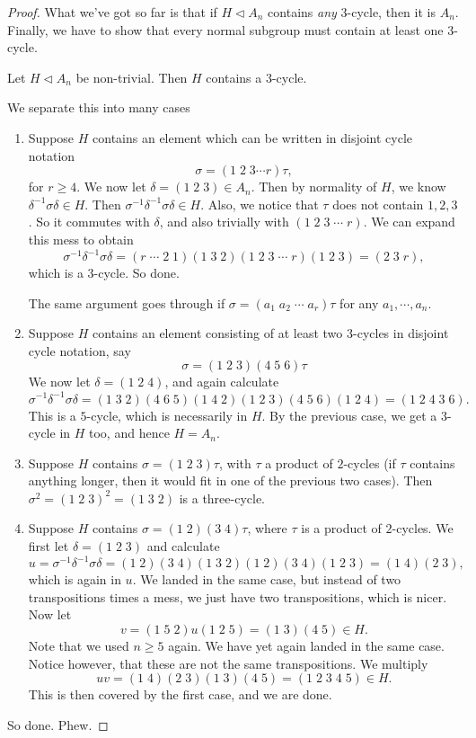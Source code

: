 \documentclass[a4paper]{article}
\begin{document}
\begin{proof}
  What we've got so far is that if $H \lhd A_n$ contains \emph{any} $3$-cycle, then it is $A_n$. Finally, we have to show that every normal subgroup must contain at least one $3$-cycle.
  \begin{claim}
    Let $H \lhd A_n$ be non-trivial. Then $H$ contains a $3$-cycle.
  \end{claim}
  We separate this into many cases
  \begin{enumerate}
    \item Suppose $H$ contains an element which can be written in disjoint cycle notation
      \[
        \sigma = (1\; 2\; 3 \cdots r) \tau,
      \]
      for $r \geq 4$. We now let $\delta = (1\; 2\; 3) \in A_n$. Then by normality of $H$, we know $\delta^{-1} \sigma \delta \in H$. Then $\sigma^{-1}\delta^{-1}\sigma \delta \in H$. Also, we notice that $\tau$ does not contain $1, 2, 3$. So it commutes with $\delta$, and also trivially with $(1\; 2\; 3\; \cdots\; r)$. We can expand this mess to obtain
      \[
        \sigma^{-1} \delta^{-1} \sigma\delta = (r\; \cdots \; 2\; 1)(1\; 3\; 2)(1\; 2\; 3\; \cdots \; r)(1\; 2\; 3) = (2\; 3 \; r),
      \]
      which is a $3$-cycle. So done.

      The same argument goes through if $\sigma = (a_1 \; a_2 \; \cdots \; a_r) \tau$ for any $a_1, \cdots, a_n$.
    \item Suppose $H$ contains an element consisting of at least two $3$-cycles in disjoint cycle notation, say
      \[
        \sigma = (1\; 2\; 3)(4\; 5\; 6)\tau
      \]
      We now let $\delta = (1\; 2\; 4)$, and again calculate
      \[
        \sigma^{-1} \delta^{-1}\sigma\delta = (1\; 3\; 2)(4\; 6\; 5)(1\; 4\; 2)(1\; 2\; 3)(4\; 5\; 6)(1\; 2\; 4) = (1\; 2\; 4\; 3\; 6).
      \]
      This is a $5$-cycle, which is necessarily in $H$. By the previous case, we get a $3$-cycle in $H$ too, and hence $H = A_n$.
    \item Suppose $H$ contains $\sigma = (1\; 2\; 3)\tau$, with $\tau$ a product of $2$-cycles (if $\tau$ contains anything longer, then it would fit in one of the previous two cases). Then $\sigma^2 = (1\; 2\; 3)^2 = (1\; 3\; 2)$ is a three-cycle.
    \item Suppose $H$ contains $\sigma = (1\; 2)(3\; 4)\tau$, where $\tau$ is a product of $2$-cycles. We first let $\delta = (1\; 2\; 3)$ and calculate
      \[
        u = \sigma^{-1}\delta^{-1}\sigma\delta = (1\; 2)(3\; 4)(1\; 3\; 2)(1\; 2)(3\; 4)(1\; 2\; 3) = (1\; 4)(2\; 3),
      \]
      which is again in $u$. We landed in the same case, but instead of two transpositions times a mess, we just have two transpositions, which is nicer. Now let
      \[
        v = (1\; 5\; 2)u (1\; 2\; 5) = (1\; 3)(4\; 5) \in H.
      \]
      Note that we used $n \geq 5$ again. We have yet again landed in the same case. Notice however, that these are not the same transpositions. We multiply
      \[
        uv = (1\; 4)(2\; 3)(1\; 3)(4\; 5) = (1\; 2\; 3\; 4\; 5) \in H.
      \]
      This is then covered by the first case, and we are done.
  \end{enumerate}
  So done. Phew.
\end{proof}
\end{document}

